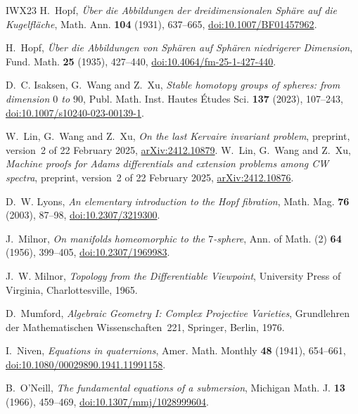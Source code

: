\documentclass[11pt]{amsart}
\numberwithin{equation}{section}
\theoremstyle{plain}
\theoremstyle{definition}
\theoremstyle{remark}
\begin{document}
\begin{thebibliography}{IWX23}
 H.~Hopf, \emph{\"Uber die Abbildungen der dreidimensionalen Sph\"are auf die Kugelfl\"ache}, Math. Ann. \textbf{104} (1931), 637--665, \href{https://doi.org/10.1007/BF01457962}{doi:10.1007/BF01457962}.

 H.~Hopf, \emph{\"Uber die Abbildungen von Sph\"aren auf Sph\"aren niedrigerer Dimension}, Fund. Math. \textbf{25} (1935), 427--440, \href{https://doi.org/10.4064/fm-25-1-427-440}{doi:10.4064/fm-25-1-427-440}.

 D.~C. Isaksen, G.~Wang and Z.~Xu, \emph{Stable homotopy groups of spheres: from dimension $0$ to $90$}, Publ. Math. Inst. Hautes \'Etudes Sci. \textbf{137} (2023), 107--243, \href{https://doi.org/10.1007/s10240-023-00139-1}{doi:10.1007/s10240-023-00139-1}.

 W.~Lin, G.~Wang and Z.~Xu, \emph{On the last Kervaire invariant problem}, preprint, version~2 of 22 February 2025, \href{https://arxiv.org/abs/2412.10879}{arXiv:2412.10879}.
 W.~Lin, G.~Wang and Z.~Xu, \emph{Machine proofs for Adams differentials and extension problems among CW spectra}, preprint, version~2 of 22 February 2025, \href{https://arxiv.org/abs/2412.10876}{arXiv:2412.10876}.

 D.~W. Lyons, \emph{An elementary introduction to the Hopf fibration}, Math. Mag. \textbf{76} (2003), 87--98, \href{https://doi.org/10.2307/3219300}{doi:10.2307/3219300}.

 J.~Milnor, \emph{On manifolds homeomorphic to the $7$-sphere}, Ann. of Math. (2) \textbf{64} (1956), 399--405, \href{https://doi.org/10.2307/1969983}{doi:10.2307/1969983}.

 J.~W. Milnor, \emph{Topology from the Differentiable Viewpoint}, University Press of Virginia, Charlottesville, 1965.

 D.~Mumford, \emph{Algebraic Geometry I: Complex Projective Varieties}, Grundlehren der Mathematischen Wissenschaften~221, Springer, Berlin, 1976.

 I.~Niven, \emph{Equations in quaternions}, Amer. Math. Monthly \textbf{48} (1941), 654--661, \href{https://doi.org/10.1080/00029890.1941.11991158}{doi:10.1080/00029890.1941.11991158}.

 B.~O'Neill, \emph{The fundamental equations of a submersion}, Michigan Math. J. \textbf{13} (1966), 459--469, \href{https://doi.org/10.1307/mmj/1028999604}{doi:10.1307/mmj/1028999604}.


\end{thebibliography}
\end{document}
